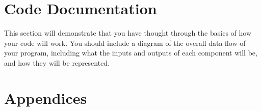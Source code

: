 \documentclass[10pt,twocolumn]{article}
\begin{document}
\begin{comment}

    Future work can involve training the model beyond word embeddings so that it can capture similar qualitative aspects of the game. (this improves recall)
    
    So, future work can include using NLP approaches like sentiment analysis, dependency parsing, etc. in order to further pinpoint game relatedness

    Dependency parsing - An Intelligent Data Analysis for Recommendation Systems Using Machine Learning

    improve conventional collaborative filtering approach by using sentiment analysis on hotel reviews for feature extraction (polarity identification using syntax and semantic analysis), evaluated w/ precision, recall, and F-1

    https://www.hindawi.com/journals/sp/2019/5941096/ - cited

    Sentiment analysis - https://www.sciencedirect.com/science/article/abs/pii/S0920548912001237 - cited

    Sentiment analysis algorithm that examines syntax-level relationships between words (via dependency parsing) in order to provide context for restaurant reviews


    Future work if more time was involved could include scraping review content from average players (from forums, Google reviews, etc.)

    Conclusion:

    
    
\end{comment}

\section{Code Documentation}

This section will demonstrate that you have thought through the basics of how your code will work. You should include a diagram of the overall data flow of your program, including what the inputs and outputs of each component will be, and how they will be represented.





\section{Appendices}

\printbibliography
\end{document}
